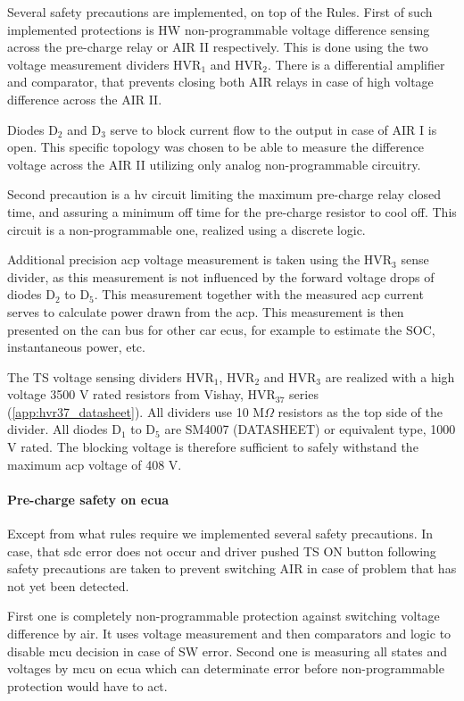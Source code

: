 Several safety precautions are implemented, on top of the Rules. First of such implemented protections is HW non-programmable voltage difference sensing across the pre-charge relay or AIR II respectively. This is done using the two voltage measurement dividers HVR$_1$ and HVR$_2$. There is a differential amplifier and comparator, that prevents closing both AIR relays in case of high voltage difference across the AIR II. 

Diodes D$_2$ and D$_3$ serve to block current flow to the output in case of AIR I is open. This specific topology was chosen to be able to measure the difference voltage across the AIR II utilizing only analog non-programmable circuitry.

Second precaution is a \gls{hv} circuit limiting the maximum pre-charge relay closed time, and assuring a minimum off time for the pre-charge resistor to cool off. This circuit is a non-programmable one, realized using a discrete logic. \label{precharge_arc_breaking}

Additional precision \gls{acp} voltage measurement is taken using the HVR$_3$ sense divider, as this measurement is not influenced by the forward voltage drops of diodes D$_2$ to D$_5$. This measurement together with the measured \gls{acp} current serves to calculate power drawn from the \gls{acp}. This measurement is then presented on the \gls{can} bus for other car \glspl{ecu}, for example to estimate the SOC, instantaneous power, etc.  

The TS voltage sensing dividers HVR$_1$, HVR$_2$ and HVR$_3$ are realized with a high voltage 3500 V rated resistors from Vishay, HVR$_{37}$ series (\ref{app:hvr37_datasheet}). All dividers use 10 M$\Omega$ resistors as the top side of the divider. All diodes D$_1$ to D$_5$ are SM4007 (DATASHEET) or equivalent type, 1000 V rated. The blocking voltage is therefore sufficient to safely withstand the maximum \gls{acp} voltage of 408 V.

\paragraph{Pre-charge safety on \gls{ecua}}
Except from what rules require we implemented several safety precautions. In case, that \gls{sdc} error does not occur and driver pushed TS ON button following safety precautions are taken to prevent switching AIR in case of problem that has not yet been detected.

First one is completely non-programmable protection against switching voltage difference by \gls{air}. It uses voltage measurement and then comparators and logic to disable \gls{mcu} decision in case of SW error.
Second one is measuring all states and voltages by \gls{mcu} on \gls{ecua} which can determinate error before non-programmable protection would have to act.

